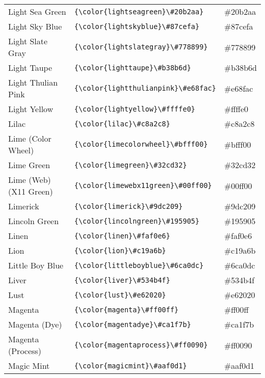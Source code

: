\documentclass[9.5pt]{article}
\begin{document}
\begin{longtable}{l | l | l}
	Light Sea Green & \verb!{\color{lightseagreen}\#20b2aa}! & {\color{lightseagreen}\#20b2aa}\\
	Light Sky Blue & \verb!{\color{lightskyblue}\#87cefa}! & {\color{lightskyblue}\#87cefa}\\
	Light Slate Gray & \verb!{\color{lightslategray}\#778899}! & {\color{lightslategray}\#778899}\\
	Light Taupe & \verb!{\color{lighttaupe}\#b38b6d}! & {\color{lighttaupe}\#b38b6d}\\
	Light Thulian Pink & \verb!{\color{lightthulianpink}\#e68fac}! & {\color{lightthulianpink}\#e68fac}\\
	Light Yellow & \verb!{\color{lightyellow}\#ffffe0}! & {\color{lightyellow}\#ffffe0}\\
	Lilac & \verb!{\color{lilac}\#c8a2c8}! & {\color{lilac}\#c8a2c8}\\
	Lime (Color Wheel) & \verb!{\color{limecolorwheel}\#bfff00}! & {\color{limecolorwheel}\#bfff00}\\
	Lime Green & \verb!{\color{limegreen}\#32cd32}! & {\color{limegreen}\#32cd32}\\
	Lime (Web) (X11 Green) & \verb!{\color{limewebx11green}\#00ff00}! & {\color{limewebx11green}\#00ff00}\\
	Limerick & \verb!{\color{limerick}\#9dc209}! & {\color{limerick}\#9dc209}\\
	Lincoln Green & \verb!{\color{lincolngreen}\#195905}! & {\color{lincolngreen}\#195905}\\
	Linen & \verb!{\color{linen}\#faf0e6}! & {\color{linen}\#faf0e6}\\
	Lion & \verb!{\color{lion}\#c19a6b}! & {\color{lion}\#c19a6b}\\
	Little Boy Blue & \verb!{\color{littleboyblue}\#6ca0dc}! & {\color{littleboyblue}\#6ca0dc}\\
	Liver & \verb!{\color{liver}\#534b4f}! & {\color{liver}\#534b4f}\\
	Lust & \verb!{\color{lust}\#e62020}! & {\color{lust}\#e62020}\\
	Magenta & \verb!{\color{magenta}\#ff00ff}! & {\color{magenta}\#ff00ff}\\
	Magenta (Dye) & \verb!{\color{magentadye}\#ca1f7b}! & {\color{magentadye}\#ca1f7b}\\
	Magenta (Process) & \verb!{\color{magentaprocess}\#ff0090}! & {\color{magentaprocess}\#ff0090}\\
	Magic Mint & \verb!{\color{magicmint}\#aaf0d1}! & {\color{magicmint}\#aaf0d1}\\

\end{longtable}
\end{document}
